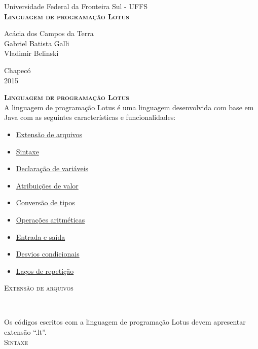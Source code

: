 \documentclass[12pt,a4paper]{article}
\begin{document}
\begin{titlepage}
\begin{center}
{\large Universidade Federal da Fronteira Sul - UFFS}\\[5.5cm]
{\bf \huge \textsc{Linguagem de programação Lotus}}\\[4.9cm]
\end{center}
{\large Acácia dos Campos da Terra}\\
{\large Gabriel Batista Galli}\\
{\large Vladimir Belinski}\\[5.8cm]
\begin{center}
{\large Chapecó}\\[0.1cm]
{\large 2015}
\end{center}
\end{titlepage}

{\bf \huge \textsc{Linguagem de programação Lotus}}\\[1.0cm]
A linguagem de programação Lotus é uma linguagem desenvolvida com base em Java com as seguintes características e funcionalidades:\\

\begin{itemize}
\item \hyperlink{label7}{Extensão de arquivos}
\item \hyperlink{label6}{Sintaxe}
\item \hyperlink{label}{Declaração de variáveis}
\item \hyperlink{label2}{Atribuições de valor}
\item \hyperlink{label8}{Conversão de tipos}
\item \hyperlink{label3}{Operações aritméticas}
\item \hyperlink{label1}{Entrada e saída}
\item \hyperlink{label4}{Desvios condicionais}
\item \hyperlink{label5}{Laços de repetição}\\[15.4cm]
\end{itemize}

\hypertarget{label7}{\Large{\textsc{Extensão de arquivos}}}\\
\normalsize

Os códigos escritos com a linguagem de programação Lotus devem apresentar extensão ``.lt''.\\[0.3cm]

\hypertarget{label6}{\Large{\textsc{Sintaxe}}}\\
\normalsize
\end{document}
